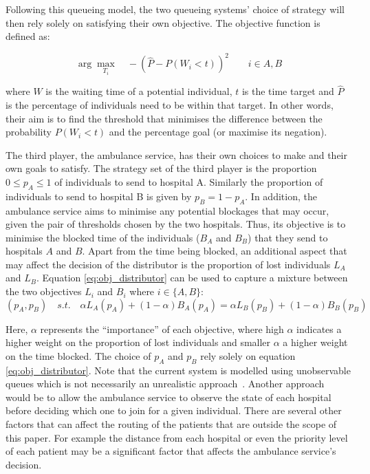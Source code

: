 Following this queueing model, the two queueing systems' choice of strategy will 
then rely solely on satisfying their own objective.
The objective function is defined as:

\begin{equation}\label{eq:obj_queueing_systems}
    \arg \max_{T_i} \quad -\left( \hat{P} - P(W_i < t) \right)^2 \qquad 
    i \in {A, B}
\end{equation}

where \(W\) is the waiting time of a potential individual, \(t\) is the time 
target and \(\hat{P}\) is the percentage of individuals need to be within that 
target. 
In other words, their aim is to find the threshold that minimises the 
difference between the probability \(P(W_i < t)\) and the percentage goal 
(or maximise its negation).

The third player, the ambulance service, has their own choices to make and 
their own 
goals to satisfy.
The strategy set of the third player is the proportion \(0 \leq p_A \leq 1\) of 
individuals to send to hospital A.
Similarly the proportion of individuals to send to hospital B is given by
\(p_B = 1 - p_A\).
In addition, the ambulance service aims to minimise any potential blockages
that may occur, given the pair of thresholds chosen by the two hospitals.
Thus, its objective is to minimise the blocked time of the individuals 
(\(B_A\) and \(B_B\))
that they send to hospitals \(A\) and \(B\).
Apart from the time being blocked, an additional aspect that may affect the 
decision of the distributor is the proportion of lost individuals 
\(L_A\) and \(L_B\).
Equation \ref{eq:obj_distributor} can be used to capture a mixture 
between the two objectives \(L_i\) and \(B_i\) where \(i \in \{A, B\}\):
\begin{equation}\label{eq:obj_distributor}
    (p_A, p_B) \quad s.t. \quad 
    \alpha L_A(p_A) + (1 - \alpha) B_A(p_A) = 
    \alpha L_B(p_B) + (1 - \alpha) B_B(p_B)
\end{equation}

Here, \(\alpha\) represents the ``importance'' of each objective,
where high \(\alpha\) indicates a higher weight on the proportion of lost 
individuals and smaller \(\alpha\) a higher weight on the time blocked. 
The choice of \(p_A\) and \(p_B\) rely solely on equation
\ref{eq:obj_distributor}.
Note that the current system is modelled using unobservable queues which is not
necessarily an unrealistic approach~\cite{unobservablequeue}.
Another approach would be to allow the ambulance service to observe the state
of each hospital before deciding which one to join for a given individual.
There are several other factors that can affect the routing of the
patients that are outside the scope of this paper.
For example the distance from each hospital or even the priority level of each
patient may be a significant factor that affects the ambulance service's
decision.

